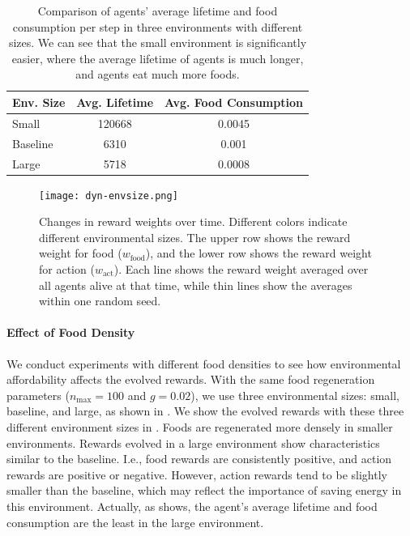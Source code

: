 \begin{table}[t]
    \centering
    \begin{tabular}{lcc}
      \toprule
      Env. Size &  Avg. Lifetime & Avg. Food Consumption \\
      \midrule
      Small &  120668 & 0.0045 \\
      Baseline & 6310 & 0.001 \\
      Large & 5718 & 0.0008 \\
      \bottomrule
    \end{tabular}
  \caption{
    Comparison of agents' average lifetime and food consumption per step in three environments with different sizes. We can see that the small environment is significantly easier, where the average lifetime of agents is much longer, and agents eat much more foods.
  }\label{table:envsize}
\end{table}

\begin{figure}[ht]
  \centering
  \texttt{[image: dyn-envsize.png]}
  \caption{
    Changes in reward weights over time.
    Different colors indicate different environmental sizes.
    The upper row shows the reward weight for food ($w_{\mathrm{food}}$), and the lower row shows the reward weight for action ($w_{\mathrm{act}}$).
    Each line shows the reward weight averaged over all agents alive at that time, while thin lines show the averages within one random seed.
  }\label{figure:result-envsize-dyn}
\end{figure}

\paragraph{Effect of Food Density}
We conduct experiments with different food densities to see how environmental affordability affects the evolved rewards. With the same food regeneration parameters ($n_{\mathrm{max}} = 100$ and $g = 0.02$), we use three environmental sizes: small, baseline, and large, as shown in . We show the evolved rewards with these three different environment sizes in . Foods are regenerated more densely in smaller environments. Rewards evolved in a large environment show characteristics similar to the baseline. I.e., food rewards are consistently positive, and action rewards are positive or negative. However, action rewards tend to be slightly smaller than the baseline, which may reflect the importance of saving energy in this environment. Actually, as  shows, the agent's average lifetime and food consumption are the least in the large environment.

